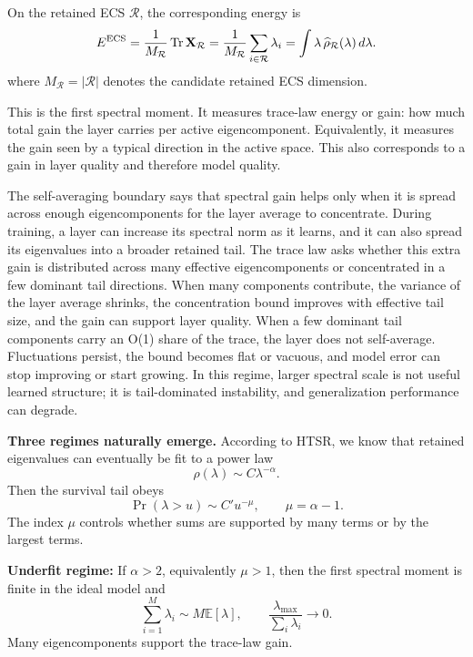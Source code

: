 \documentclass[10pt,twocolumn]{article}
\newcommand{\Tr}{\operatorname{Tr}}
\newcommand{\dd}{\,d}
\newcommand{\X}{\mathbf X}
\newcommand{\Rell}{\mathcal R}
\newcommand{\rhohat}{\widehat\rho}
\newif\ifUseTildeECSNotation
\newcommand{\Mred}{M_{\Rell}}
\newcommand{\Ered}{\ifUseTildeECSNotation \widetilde E\else E^{\rm ECS}\fi}
\begin{document}
On the retained ECS $\Rell$, the corresponding energy is
\begin{equation}
  \Ered
  =\frac{1}{\Mred}\Tr \X_{\Rell}
  =\frac{1}{\Mred}\sum_{i\in\Rell}\lambda_i
=\int\lambda\,\rhohat_{\Rell}(\lambda)\dd\lambda.
\label{eq:Ered_prob}
\end{equation}
where $\Mred=|\Rell|$ denotes the candidate retained ECS dimension.

This is the first spectral moment.
It measures trace-law energy or gain: how much total gain the layer carries per active eigencomponent.
Equivalently, it measures the gain seen by a typical direction in the active space.
This also corresponds to a gain in layer quality and therefore model quality.

The self-averaging boundary says that spectral gain helps only when it is spread across enough eigencomponents for the layer average to concentrate. During training, a layer can increase its spectral norm as it learns, and it can also spread its eigenvalues into a broader retained tail. The trace law asks whether this extra gain is distributed across many effective eigencomponents or concentrated in a few dominant tail directions. When many components contribute, the variance of the layer average shrinks, the concentration bound improves with effective tail size, and the gain can support layer quality. When a few dominant tail components carry an O(1) share of the trace, the layer does not self-average. Fluctuations persist, the bound becomes flat or vacuous, and model error can stop improving or start growing. In this regime, larger spectral scale is not useful learned structure; it is tail-dominated instability, and generalization performance can degrade.


\medskip\noindent\textbf{Three regimes naturally emerge.}
According to HTSR, we know that retained eigenvalues can eventually be fit to a power law
\begin{equation}
\rho(\lambda)\sim C\lambda^{-\alpha}.
\label{eq:tailideal}
\end{equation}
Then the survival tail obeys
\begin{equation}
\Pr(\lambda>u)\sim C'u^{-\mu},
\qquad
\mu=\alpha-1.
\label{eq:mu}
\end{equation}
The index $\mu$ controls whether sums are supported by many terms or by the largest terms.


\medskip\noindent\textbf{Underfit regime:} If $\alpha>2$, equivalently $\mu>1$, then the first spectral moment is finite in the ideal model and
\begin{equation}
\sum_{i=1}^{M}\lambda_i\sim M\mathbb E[\lambda],
\qquad
\frac{\lambda_{\max}}{\sum_i\lambda_i}\to0 .
\label{eq:sa_alpha_gt_two}
\end{equation}
Many eigencomponents support the trace-law gain.
\end{document}

